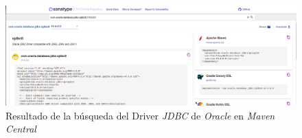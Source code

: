 \documentclass[11pt,a4paper]{article}
\begin{document}
\begin{landscape}
\begin{figure}
\centering
\includegraphics[scale=0.4]{images/mavenCentral.png}
\caption{Resultado de la búsqueda del Driver \emph{JDBC} de \emph{Oracle} en \emph{Maven Central}}
\label{fig:mavenCentral}
\end{figure}
\end{landscape}
\end{document}
